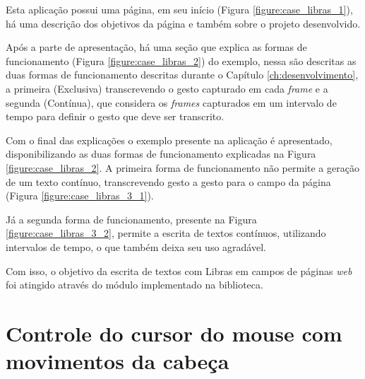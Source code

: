 \par Esta aplicação possui uma página, em seu início (Figura \ref{figure:case_libras_1}), há uma descrição dos objetivos da página e também sobre o projeto desenvolvido.


\par Após a parte de apresentação, há uma seção que explica as formas de funcionamento (Figura \ref{figure:case_libras_2}) do exemplo, nessa são descritas as duas formas de funcionamento descritas durante o Capítulo \ref{ch:desenvolvimento}, a primeira (Exclusiva) transcrevendo o gesto capturado em cada \textit{frame} e a segunda (Contínua), que considera os \textit{frames} capturados em um intervalo de tempo para definir o gesto que deve ser transcrito.


\par Com o final das explicações o exemplo presente na aplicação é apresentado, disponibilizando as duas formas de funcionamento explicadas na Figura \ref{figure:case_libras_2}. A primeira forma de funcionamento não permite a geração de um texto contínuo, transcrevendo gesto a gesto para o campo da página (Figura \ref{figure:case_libras_3_1}). 


\par Já a segunda forma de funcionamento, presente na Figura \ref{figure:case_libras_3_2}, permite a escrita de textos contínuos, utilizando intervalos de tempo, o que também deixa seu uso agradável.


\par Com isso, o objetivo da escrita de textos com Libras em campos de páginas \textit{web} foi atingido através do módulo implementado na biblioteca.

\section{Controle do cursor do mouse com movimentos da cabeça}

